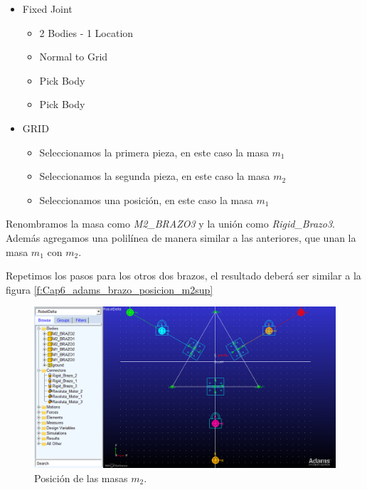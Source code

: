         \begin{scope}
            \renewcommand{\labelitemi}{\blacklozenge}
            \renewcommand{\labelitemii}{\checkmark}
            \begin{itemize}
                \item Fixed Joint
                \begin{itemize}
                    \item 2 Bodies - 1 Location
                    \item Normal to Grid
                    \item Pick Body
                    \item Pick Body
                \end{itemize}
                \item GRID 
                \begin{itemize}
                    \item Seleccionamos la primera pieza, en este caso la masa $m_{1}$
                    \item Seleccionamos la segunda pieza, en este caso la masa $m_{2}$
                    \item Seleccionamos una posición, en este caso la masa $m_{1}$
                \end{itemize}
            \end{itemize}
        \end{scope}
        
        Renombramos la masa como \textit{M2\_BRAZO3} y la unión  como \textit{Rigid\_Brazo3}. Además agregamos una polilínea de manera similar a las anteriores, que unan la masa $m_{1}$ con    $m_{2}$.
        
        Repetimos los pasos para los otros dos brazos, el resultado deberá ser similar a la figura \eqref{f:Cap6_adams_brazo_posicion_m2sup}
        
        \begin{figure}[h]
            \centering
            \includegraphics[width=1\linewidth]{Main/Chapter6/Images6/adams/antebrazo/posicion_m2_sup.png}
            \caption{Posición de las masas $m_{2}$.}
            \label{f:Cap6_adams_brazo_posicion_m2sup}
        \end{figure}
        
